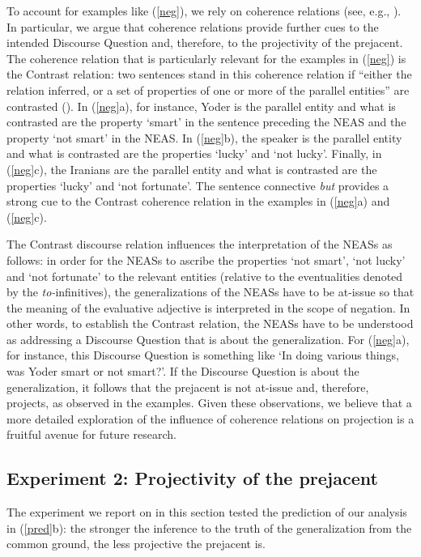 \documentclass[11pt,fleqn]{article}
\newcommand{\6}{\mbox{$[\hspace*{-.6mm}[$}}
\newcommand{\9}{\mbox{$]\hspace*{-.6mm}]$}}
\begin{document}
To account for examples like (\ref{neg}), we rely on coherence relations (see, e.g., \citealt{hobbs1985,mann-thompson1988,asher-lascarides2003,kehler2004}). In particular, we argue that coherence relations provide further cues to the intended Discourse Question and, therefore, to the projectivity of the prejacent. The coherence relation that  is particularly relevant for the examples in (\ref{neg}) is the Contrast relation:  two sentences stand in this coherence relation if ``either the relation inferred, or a set of properties of one or more of the parallel entities'' are contrasted (\citealt[432]{kehler00}). In (\ref{neg}a), for instance, Yoder is the parallel entity and what is contrasted are the property `smart' in the sentence preceding the NEAS and the property `not smart' in the NEAS. In (\ref{neg}b), the speaker is the parallel entity and what is contrasted are the properties `lucky' and `not lucky'. Finally, in (\ref{neg}c), the Iranians are the parallel entity and what is contrasted are the properties `lucky' and `not fortunate'. The sentence connective {\em but} provides a strong cue to the Contrast coherence relation in the examples in (\ref{neg}a) and (\ref{neg}c).  

The Contrast discourse relation influences the interpretation of the NEASs as follows: in order for the NEASs to ascribe the properties `not smart', `not lucky' and `not fortunate' to the relevant entities (relative to the eventualities denoted by the {\em to-}infinitives), the generalizations of the NEASs have to be at-issue so that the meaning of the evaluative adjective is interpreted in the scope of negation. In other words, to establish the Contrast relation, the NEASs have to be understood as addressing a Discourse Question that is about the generalization. For (\ref{neg}a), for instance, this Discourse Question is something like `In doing various things, was Yoder smart or not smart?'. If the Discourse Question is about the generalization, it follows that the prejacent is not at-issue and, therefore, projects, as observed in the examples. Given these observations, we believe that a more detailed exploration of the influence of coherence relations on projection is a fruitful avenue for future research. 

\subsection{Experiment 2: Projectivity of the prejacent}\label{s42}

The experiment we report on in this section tested the prediction of our analysis in (\ref{pred}b): the stronger the inference to the truth of the generalization from the common ground, the less projective the prejacent is.
\end{document}
